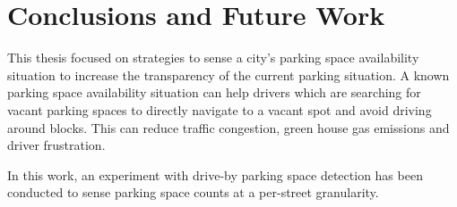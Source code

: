 \chapter{Conclusions and Future Work}
\label{chap:conclusion}



This thesis focused on strategies to sense a city's parking space availability situation to increase the transparency of the current parking situation. 
A known parking space availability situation can help drivers which are searching for vacant parking spaces to directly navigate to a vacant spot and avoid driving around blocks. This can reduce traffic congestion, green house gas emissions and driver frustration. 

In this work, an experiment with drive-by parking space detection has been conducted to sense parking space counts at a per-street granularity. 

